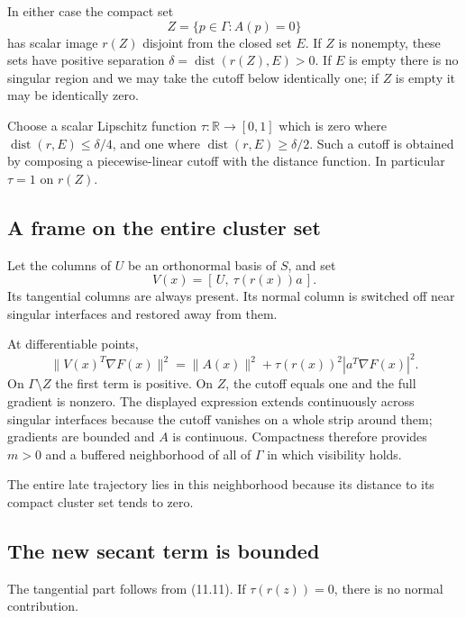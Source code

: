 In either case the compact set \[
 Z=\{p\in\Gamma:A(p)=0\}
\] has scalar image \(r(Z)\) disjoint from the closed set \(E\). If
\(Z\) is nonempty, these sets have positive separation
\(\delta=\operatorname{dist}(r(Z),E)>0\). If \(E\) is empty there is no
singular region and we may take the cutoff below identically one; if
\(Z\) is empty it may be identically zero.

Choose a scalar Lipschitz function \(\tau:\mathbb R\to[0,1]\) which is
zero where \(\operatorname{dist}(r,E)\le\delta/4\), and one where
\(\operatorname{dist}(r,E)\ge\delta/2\). Such a cutoff is obtained by
composing a piecewise-linear cutoff with the distance function. In
particular \(\tau=1\) on \(r(Z)\).



\subsection{A frame on the entire cluster
set}\label{U:a-frame-on-the-entire-cluster-set}

Let the columns of \(U\) be an orthonormal basis of \(S\), and set \[
 \boxed{V(x)=[\,U,\ \tau(r(x))a\,].}\tag{11.12}
\] Its tangential columns are always present. Its normal column is
switched off near singular interfaces and restored away from them.

At differentiable points, \[
 \|V(x)^T\nabla F(x)\|^2
 =\|A(x)\|^2+\tau(r(x))^2|a^T\nabla F(x)|^2.
\] On \(\Gamma\setminus Z\) the first term is positive. On \(Z\), the
cutoff equals one and the full gradient is nonzero. The displayed
expression extends continuously across singular interfaces because the
cutoff vanishes on a whole strip around them; gradients are bounded and
\(A\) is continuous. Compactness therefore provides \(m>0\) and a
buffered neighborhood of all of \(\Gamma\) in which visibility holds.

The entire late trajectory lies in this neighborhood because its
distance to its compact cluster set tends to zero.



\subsection{The new secant term is
bounded}\label{U:the-new-secant-term-is-bounded}


The tangential part follows from (11.11). If \(\tau(r(z))=0\), there is no
normal contribution.

